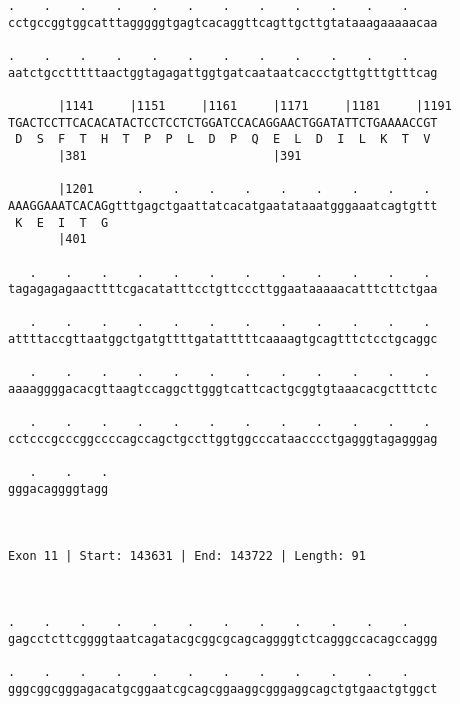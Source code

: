 \documentclass{article}
\begin{document}
\begin{Verbatim}
.    .    .    .    .    .    .    .    .    .    .    .    
cctgccggtggcatttagggggtgagtcacaggttcagttgcttgtataaagaaaaacaa
                                                            
.    .    .    .    .    .    .    .    .    .    .    .    
aatctgcctttttaactggtagagattggtgatcaataatcaccctgttgtttgtttcag
                                                            
       |1141     |1151     |1161     |1171     |1181     |1191
TGACTCCTTCACACATACTCCTCCTCTGGATCCACAGGAACTGGATATTCTGAAAACCGT
 D  S  F  T  H  T  P  P  L  D  P  Q  E  L  D  I  L  K  T  V 
       |381                          |391                   
  
       |1201      .    .    .    .    .    .    .    .    . 
AAAGGAAATCACAGgtttgagctgaattatcacatgaatataaatgggaaatcagtgttt
 K  E  I  T  G                                              
       |401                                                 
  
   .    .    .    .    .    .    .    .    .    .    .    . 
tagagagagaacttttcgacatatttcctgttcccttggaataaaaacatttcttctgaa
                                                            
   .    .    .    .    .    .    .    .    .    .    .    . 
attttaccgttaatggctgatgttttgatatttttcaaaagtgcagtttctcctgcaggc
                                                            
   .    .    .    .    .    .    .    .    .    .    .    . 
aaaaggggacacgttaagtccaggcttgggtcattcactgcggtgtaaacacgctttctc
                                                            
   .    .    .    .    .    .    .    .    .    .    .    . 
cctcccgcccggccccagccagctgccttggtggcccataacccctgagggtagagggag
                                                            
   .    .    .
gggacaggggtagg
              
              
 
Exon 11 | Start: 143631 | End: 143722 | Length: 91



.    .    .    .    .    .    .    .    .    .    .    .    
gagcctcttcggggtaatcagatacgcggcgcagcaggggtctcagggccacagccaggg
                                                            
.    .    .    .    .    .    .    .    .    .    .    .    
gggcggcgggagacatgcggaatcgcagcggaaggcgggaggcagctgtgaactgtggct
                                                            

\end{Verbatim}
\end{document}
